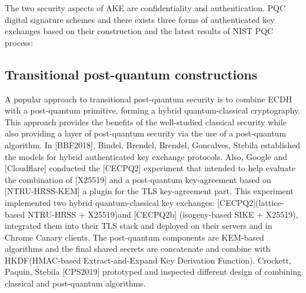 The two security aspects of AKE are confidentiality and authentication. PQC digital signature schemes 
and there exists three forms of authenticated key exchanges based on their construction and the latest results of NIST PQC process:


\subsection{Transitional post-quantum constructions}
A popular approach to transitional post-quantum security is to combine ECDH with a post-quantum primitive, forming a hybrid quantum-classical cryptography. This approach provides the benefits of the well-studied classical security while also providing a layer of post-quantum security via the use of a post-quantum algorithm. In [BBF2018], Bindel, Brendel, Brendel, Goncalves, Stebila established the models for hybrid authenticated key exchange protocols. Also, Google and [Cloudflare] conducted the [CECPQ2] experiment that intended to help evaluate the combination of [X25519] and a post-quantum key-agreement based on [NTRU-HRSS-KEM] a plugin for the TLS key-agreement part. This experiment implemented two hybrid quantum-classical key exchanges: [CECPQ2](lattice-based NTRU-HRSS + X25519)and [CECPQ2b] (isogeny-based SIKE + X25519), integrated them into their TLS stack and deployed on their servers and in Chrome Canary clients. The post-quantum components are KEM-based algorithms and the final shared secrets are concatenate and combine with HKDF(HMAC-based Extract-and-Expand Key Derivation Function). 
Crockett, Paquin, Stebila [CPS2019] prototyped and inspected different design of combining classical and post-quantum algorithms. 


